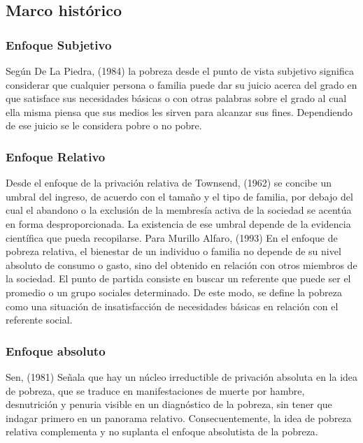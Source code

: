 \subsection{Marco histórico}
	
\subsubsection{Enfoque Subjetivo}

Según De La Piedra, (1984) la pobreza desde el punto de vista subjetivo significa considerar que cualquier persona o familia puede dar su juicio acerca del grado en que satisface sus necesidades básicas o con otras palabras sobre el grado al cual ella misma piensa que sus medios les sirven para alcanzar sus fines. Dependiendo de ese juicio se le considera pobre o no pobre.

\subsubsection{Enfoque Relativo}
Desde el enfoque de la privación relativa de Townsend, (1962) se concibe un umbral del ingreso, de acuerdo con el tamaño y el tipo de familia, por debajo del cual el abandono o la exclusión de la membresía activa de la sociedad se acentúa en forma desproporcionada. La existencia de ese umbral depende de la evidencia científica que pueda recopilarse.
Para Murillo Alfaro, (1993) En el enfoque de pobreza relativa, el bienestar de un individuo o familia no depende de su nivel absoluto de consumo o gasto, sino del obtenido en relación con otros miembros de la sociedad. El punto de partida consiste en buscar un referente que puede ser el promedio o un grupo sociales determinado. De este modo, se define la pobreza como una situación de insatisfacción de necesidades básicas en relación con el referente social.

\subsubsection{Enfoque absoluto}

Sen, (1981) Señala que hay un núcleo irreductible de privación absoluta en la idea de pobreza, que se traduce en manifestaciones de muerte por hambre, desnutrición y penuria visible en un diagnóstico de la pobreza, sin tener que indagar primero en un panorama relativo. Consecuentemente, la idea de pobreza relativa complementa y no suplanta el enfoque absolutista de la pobreza.